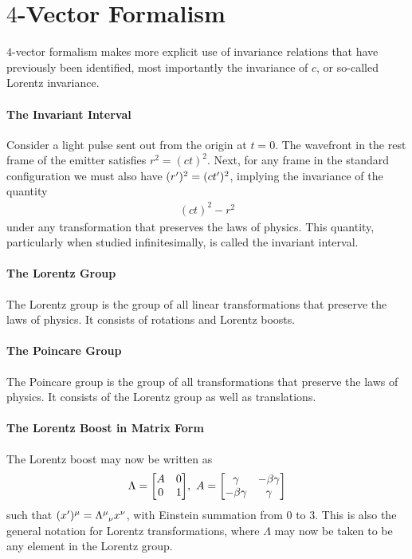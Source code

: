 \section{$4$-Vector Formalism}

$4$-vector formalism makes more explicit use of invariance relations that have previously been identified, most importantly the invariance of $c$, or so-called Lorentz invariance.

\paragraph{The Invariant Interval}
Consider a light pulse sent out from the origin at $t = 0$. The wavefront in the rest frame of the emitter satisfies $r^{2} = (ct)^{2}$. Next, for any frame in the standard configuration we must also have $(r^{\prime})^{2} = (ct^{\prime})^{2}$, implying the invariance of the quantity
\begin{align*}
	(ct)^{2} - r^{2}
\end{align*}
under any transformation that preserves the laws of physics. This quantity, particularly when studied infinitesimally, is called the invariant interval.

\paragraph{The Lorentz Group}
The Lorentz group is the group of all linear transformations that preserve the laws of physics. It consists of rotations and Lorentz boosts.

\paragraph{The Poincare Group}
The Poincare group is the group of all transformations that preserve the laws of physics. It consists of the Lorentz group as well as translations.

\paragraph{The Lorentz Boost in Matrix Form}
The Lorentz boost may now be written as
\begin{align*}
	\Lambda =
	\mqty[
		A & 0 \\
		0 & 1
	],\ 
	A =
	\mqty[
		\gamma       & -\beta\gamma \\
		-\beta\gamma & \gamma
	]
\end{align*}
such that $(x\p)^{\mu} = \tensor{\Lambda}{^{\mu}_{\nu}}x^{\nu}$, with Einstein summation from $0$ to $3$. This is also the general notation for Lorentz transformations, where $\Lambda$ may now be taken to be any element in the Lorentz group.


